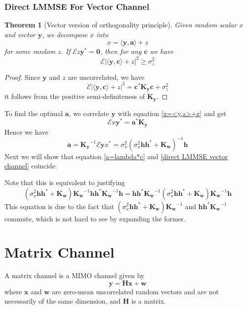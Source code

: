 \documentclass[12pt]{article}
\newtheorem{theorem}{Theorem}
\theoremstyle{definition}
\begin{document}
\subsubsection{Direct LMMSE For Vector Channel}
\begin{theorem}[Vector version of orthogonality principle]
	Given random scalar $x$ and vector $\bm{y}$, we decompose $x$ into 
	\begin{equation}
		x=\langle \bm{y},\bm{a}\rangle+z\label{x=<y,a>+z}
	\end{equation}
	for some random $z$. If $\mathcal{E}z\bm{y}^*=\bm{0}$, then for any $\bm{c}$ we have
	$$\mathcal{E}|\langle \bm{y},\bm{c}\rangle+z|^2\geq\sigma_z^2$$
\end{theorem}
\begin{proof}
	Since $\bm{y}$ and $z$ are uncorrelated, we have
	$$\mathcal{E}|\langle \bm{y},\bm{c}\rangle+z|^2=\bm{c}^*\bm{K_y}\bm{c}+\sigma_z^2$$
	it follows from the positive semi-definiteness of $\bm{K_y}$.
\end{proof}
To find the optimal $\bm{a}$, we correlate $\bm{y}$ with equation \ref{x=<y,a>+z} and get
$$\mathcal{E}x\bm{y}^*=\bm{a}^*\bm{K_y}$$
Hence we have
\begin{equation}
	\bm{a}=\bm{K_y}^{-1}\mathcal{E}\bm{y}x^*=\sigma_x^2\left(\sigma_x^2\bm{h}\bm{h}^*+\bm{K_w}\right)^{-1}\bm{h}\label{direct LMMSE vector channel}
\end{equation}
Next we will show that equation \ref{a=lambda*c} and \ref{direct LMMSE vector channel} coincide.

Note that this is equivalent to justifying
$$\left(\sigma_x^2\bm{h}\bm{h}^*+\bm{K_w}\right)\bm{K_w}^{-1}\bm{h}\bm{h}^*\bm{K_w}^{-1}\bm{h}=\bm{h}\bm{h}^*\bm{K_w}^{-1}\left(\sigma_x^2\bm{h}\bm{h}^*+\bm{K_w}\right)\bm{K_w}^{-1}\bm{h}$$
This equation is due to the fact that $\left(\sigma_x^2\bm{h}\bm{h}^*+\bm{K_w}\right)\bm{K_w}^{-1}$ and $\bm{h}\bm{h}^*\bm{K_w}^{-1}$ commute, which is not hard to see by expanding the former.

\section{Matrix Channel}
A matrix channel is a MIMO channel given by
\begin{equation}
	\bm{y}=\bm{Hx}+\bm{w}\label{matrix channel}
\end{equation}
where $\bm{x}$ and $\bm{w}$ are zero-mean uncorrelated random vectors and are not necessarily of the same dimension, and $\bm{H}$ is a matrix.
\end{document}
